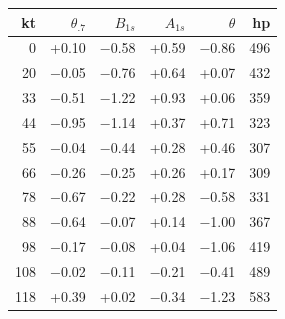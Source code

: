 \begin{tabular}{@{}rrrrrr@{}}
\toprule
kt & $\theta_{.7}$ & $B_{1s}$ & $A_{1s}$ & $\theta$ & hp \\
\midrule
0 & +0.10 & $-$0.58 & +0.59 & $-$0.86 & 496 \\
20 & $-$0.05 & $-$0.76 & +0.64 & +0.07 & 432 \\
33 & $-$0.51 & $-$1.22 & +0.93 & +0.06 & 359 \\
44 & $-$0.95 & $-$1.14 & +0.37 & +0.71 & 323 \\
55 & $-$0.04 & $-$0.44 & +0.28 & +0.46 & 307 \\
66 & $-$0.26 & $-$0.25 & +0.26 & +0.17 & 309 \\
78 & $-$0.67 & $-$0.22 & +0.28 & $-$0.58 & 331 \\
88 & $-$0.64 & $-$0.07 & +0.14 & $-$1.00 & 367 \\
98 & $-$0.17 & $-$0.08 & +0.04 & $-$1.06 & 419 \\
108 & $-$0.02 & $-$0.11 & $-$0.21 & $-$0.41 & 489 \\
118 & +0.39 & +0.02 & $-$0.34 & $-$1.23 & 583 \\
\bottomrule
\end{tabular}
